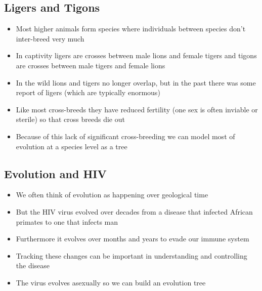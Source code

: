
\begin{slide}
\section{Ligers and Tigons}

\begin{PauseHighLight}
  \begin{itemize}
  \item Most higher animals form species where individuals between
    species don't inter-breed\pause{} very much\pauseb
  \item In captivity ligers are crosses between male lions and female
    tigers  and tigons are crosses between male tigers and female
    lions\pause
  \item In the wild lions and tigers no longer overlap, but in the past
    there was some report of ligers (which are typically enormous)\pause
  \item Like most cross-breeds they have reduced fertility (one sex is
    often inviable or sterile) so that cross breeds die out\pause
  \item Because of this lack of significant cross-breeding we can model
    most of evolution at a species level as a tree\pause
  \end{itemize}
\end{PauseHighLight}

\end{slide}


\begin{slide}
\section{Evolution and HIV}

\begin{PauseHighLight}
  \begin{itemize}
  \item We often think of evolution as happening over geological
    time\pause
  \item But the HIV virus evolved over decades from a disease that
    infected African primates to one that infects man\pause
  \item Furthermore it evolves over months and years to evade our
    immune system\pause
  \item Tracking these changes can be important in understanding and
    controlling the disease\pause
  \item The virus evolves asexually so we can build an evolution
    tree\pause
  \end{itemize}
\end{PauseHighLight}

\end{slide}




